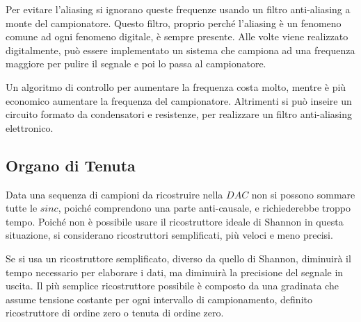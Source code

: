 \documentclass{article}
\numberwithin{equation}{subsection}
\begin{document}
Per evitare l'aliasing si ignorano queste frequenze usando un filtro anti-aliasing a monte del campionatore. Questo filtro, proprio perché l'aliasing è un fenomeno comune 
ad ogni fenomeno digitale, è sempre presente. Alle volte viene realizzato digitalmente, può essere implementato un sistema che campiona ad una frequenza maggiore per pulire 
il segnale e poi lo passa al campionatore. 

Un algoritmo di controllo per aumentare la frequenza costa molto, mentre è più economico aumentare la frequenza del campionatore. Altrimenti si può inseire un circuito formato 
da condensatori e resistenze, per realizzare un filtro anti-aliasing elettronico. 

\subsection{Organo di Tenuta}

Data una sequenza di campioni da ricostruire nella $DAC$ non si possono sommare tutte le $sinc$, poiché comprendono una parte anti-causale, e richiederebbe troppo tempo. 
Poiché non è possibile usare il ricostruttore ideale di Shannon in questa situazione, si considerano ricostruttori semplificati, più veloci e meno precisi. 

Se si usa un ricostruttore semplificato, diverso da quello di Shannon, diminuirà il tempo necessario per elaborare 
i dati, ma diminuirà la precisione del segnale in uscita. Il più semplice ricostruttore possibile è composto 
da una gradinata che assume tensione costante per ogni intervallo di campionamento, definito ricostruttore di ordine zero o tenuta di ordine zero. 

\begin{center}
\end{center}
\end{document}
